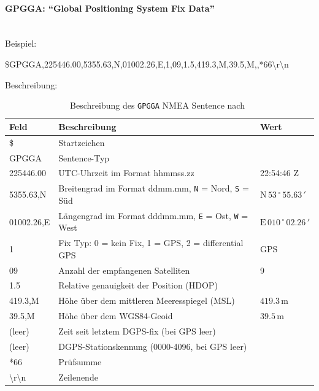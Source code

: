         \paragraph{GPGGA: ``Global Positioning System Fix Data''}\mbox{}\\
        Beispiel:
        \begin{center}
            \$GPGGA,225446.00,5355.63,N,01002.26,E,1,09,1.5,419.3,M,39.5,M,,*66\textbackslash r\textbackslash n
        \end{center}
        
        Beschreibung:
        \begin{table}[H]
            \centering
            \begin{tabular}{|l|l|l|}
                \hline
                \textbf{Feld}   & \textbf{Beschreibung}                 & \textbf{Wert}\\
                \hline
                \$              & Startzeichen                          & \\
                GPGGA           & Sentence-Typ                          & \\
                225446.00       & UTC-Uhrzeit im Format hhmmss.zz       & 22:54:46 Z \\
                5355.63,N       & Breitengrad im Format ddmm.mm, \texttt{N} = Nord, \texttt{S} = Süd & $\mathrm{N}\,53\,^\circ\,55.63\,'$\\
                01002.26,E      & Längengrad im Format dddmm.mm, \texttt{E} = Ost, \texttt{W} = West & $\mathrm{E}\,010\,^\circ\,02.26\,'$\\
                1               & Fix Typ: 0 = kein Fix, 1 = GPS, 2 = differential GPS & GPS \\
                09              & Anzahl der empfangenen Satelliten     & 9\\
                1.5             & Relative genauigkeit der Position (HDOP) & \\
                419.3,M         & Höhe über dem mittleren Meeresspiegel (MSL) & $419.3\,\mathrm{m}$\\
                39.5,M          & Höhe über dem WGS84-Geoid & $39.5\,\mathrm{m}$ \\
                (leer)          & Zeit seit letztem DGPS-fix (bei GPS leer) & \\
                (leer)          & DGPS-Stationskennung (0000-4096, bei GPS leer) & \\
                *66             & Prüfsumme & \\
                \textbackslash r\textbackslash n & Zeilenende          & \\
                \hline
            \end{tabular}
            \caption{Beschreibung des \texttt{GPGGA} NMEA Sentence nach~\cite{nmea0183}}
            \label{nmea_gpgga} 
        \end{table}
    
